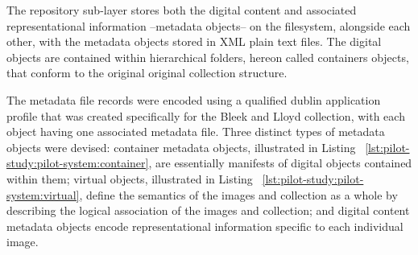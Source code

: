 The repository sub-layer stores both the digital content and associated
representational information --metadata objects-- on the filesystem, alongside
each other, with the metadata objects stored in XML plain text files. The
digital objects are contained within hierarchical folders, hereon called
containers objects, that conform to the original original collection structure. 

The metadata file records were encoded using a qualified dublin application
profile \citep{Coyle2009} that was created specifically for the Bleek and Lloyd
collection, with each object having one associated metadata file. Three
distinct types of metadata objects were devised: container metadata objects,
illustrated in Listing ~\ref{lst:pilot-study:pilot-system:container}, are
essentially manifests of digital objects contained within them; virtual
objects, illustrated in Listing ~\ref{lst:pilot-study:pilot-system:virtual},
define the semantics of the images and collection as a whole by describing the
logical association of the images and collection; and digital content metadata
objects encode representational information specific to each individual image.






